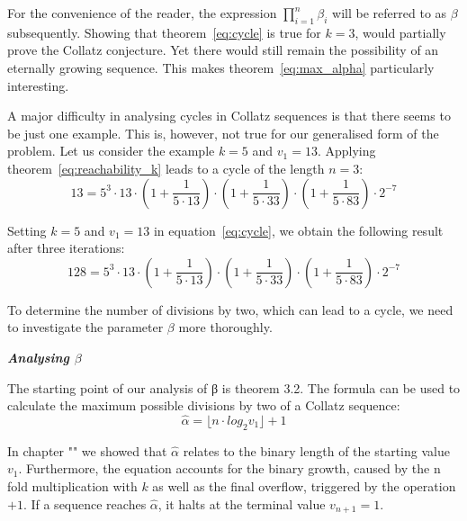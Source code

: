 \documentclass{SciPress_2015}
\renewcommand{\subsection}[1]{\textit{\textbf{#1}}}
\begin{document}
\par\medskip
For the convenience of the reader, the expression $\prod_{i=1}^{n}\beta_i$ will be referred to as $\beta$ subsequently. Showing that theorem~\ref{eq:cycle} is true for $k=3$, would partially prove the Collatz conjecture. Yet there would still remain the possibility of an eternally growing sequence. This makes theorem~\ref{eq:max_alpha} particularly interesting.

\par\medskip
A major difficulty in analysing cycles in Collatz sequences is that there seems to be just one example. This is, however, not true for our generalised form of the problem. Let us consider the example $k=5$ and $v_1=13$. Applying theorem~\ref{eq:reachability_k} leads to a cycle of the length $n=3$:
\[
13=5^3\cdot13\cdot\left(1+\frac{1}{5\cdot13}\right)\cdot\left(1+\frac{1}{5\cdot33}\right)\cdot\left(1+\frac{1}{5\cdot83}\right)\cdot2^{-7}
\]

Setting $k=5$ and $v_1=13$ in equation~\ref{eq:cycle}, we obtain the following result after three iterations:
\[
128=5^3\cdot13\cdot\left(1+\frac{1}{5\cdot13}\right)\cdot\left(1+\frac{1}{5\cdot33}\right)\cdot\left(1+\frac{1}{5\cdot83}\right)\cdot2^{-7}
\]

To determine the number of divisions by two, which can lead to a cycle, we need to investigate the parameter $\beta$ more thoroughly.

\vspace{1em}\noindent
\subsection{Analysing \boldmath$\beta$}
\par\noindent
The starting point of our analysis of β is theorem 3.2. The formula can be used to calculate the maximum possible divisions by two of a Collatz sequence:
\[
\hat\alpha=\lfloor n\cdot log_2v_1\rfloor+1
\]

In chapter "" we showed that $\hat\alpha$ relates to the binary length of the starting value $v_1$. Furthermore, the equation accounts for the binary growth, caused by the n fold multiplication with $k$ as well as the final overflow, triggered by the operation $+1$. If a sequence reaches $\hat\alpha$, it halts at the terminal value $v_{n+1}=1$.
\end{document}

